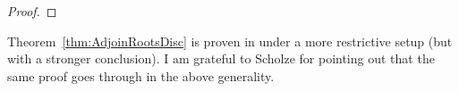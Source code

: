 \documentclass[10pt,reqno]{amsart}
\begin{document}
\begin{proof}
\end{proof}

\begin{remark}
Theorem~\ref{thm:AdjoinRootsDisc} is proven in \cite{AndreDSC} under a more restrictive setup (but with a stronger conclusion). I am grateful to Scholze for pointing out that the same proof goes through in the above generality.
\end{remark}
\end{document}
